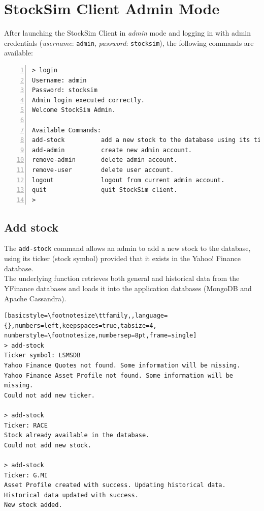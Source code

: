 \section{StockSim Client Admin Mode}
After launching the StockSim Client in \textit{admin} mode and logging in with
admin credentials (\textit{username}: \texttt{admin}, \textit{password}:
\texttt{stocksim}), the following commands are available:
\begin{lstlisting}[basicstyle=\footnotesize\ttfamily,language={},numbers=left,keepspaces=true,tabsize=4,
numberstyle=\footnotesize,numbersep=8pt,frame=single]
> login
Username: admin
Password: stocksim
Admin login executed correctly.
Welcome StockSim Admin.

Available Commands:
add-stock          add a new stock to the database using its ticker.
add-admin          create new admin account.               
remove-admin       delete admin account.                   
remove-user        delete user account.                    
logout             logout from current admin account.      
quit               quit StockSim client.                   
> 
\end{lstlisting}
\vspace{-0.5cm}
\subsection{Add stock}
The \texttt{add-stock} command allows an admin to add a new stock to the
database, using its ticker (stock symbol) provided that it exists in the
Yahoo! Finance database.\\
The underlying function retrieves both general and historical data from the
YFinance databases and loads it into the application databases (MongoDB and
Apache Cassandra).
\begin{lstlisting}[basicstyle=\footnotesize\ttfamily,,language={},numbers=left,keepspaces=true,tabsize=4,
numberstyle=\footnotesize,numbersep=8pt,frame=single]
> add-stock
Ticker symbol: LSMSDB
Yahoo Finance Quotes not found. Some information will be missing.
Yahoo Finance Asset Profile not found. Some information will be missing.
Could not add new ticker.

> add-stock
Ticker: RACE
Stock already available in the database.
Could not add new stock.

> add-stock
Ticker: G.MI
Asset Profile created with success. Updating historical data.
Historical data updated with success.
New stock added.
\end{lstlisting}
\vspace{-0.5cm}
